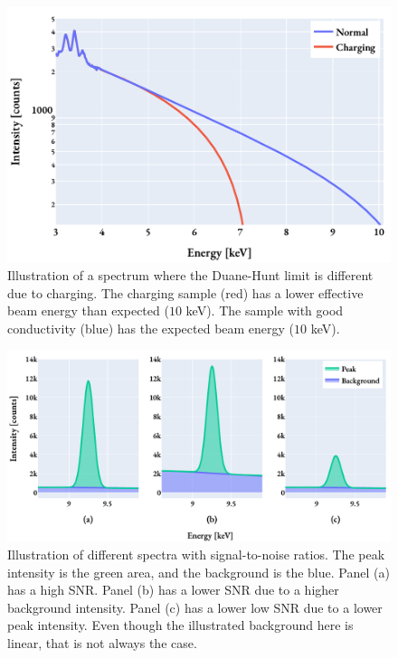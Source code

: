 
\begin{figure}[htp]
    \centering
    \includegraphics[width=0.6\linewidth]{figures/pp_duane-hunt.pdf}
    \caption{
        Illustration of a spectrum where the Duane-Hunt limit is different due to charging.
        The charging sample (red) has a lower effective beam energy than expected ($10$ keV).
        The sample with good conductivity (blue) has the expected beam energy ($10$ keV).
    }
    \label{fig:theory:eds_performance:overview:duanehunt}
\end{figure}


\begin{figure}[htp]
    \centering
    \includegraphics[width=0.8\linewidth]{figures/pp_fiori_snr.pdf}
    \caption{
        Illustration of different spectra with signal-to-noise ratios.
        The peak intensity is the green area, and the background is the blue.
        Panel (a) has a high SNR.
        Panel (b) has a lower SNR due to a higher background intensity.
        Panel (c) has a lower low SNR due to a lower peak intensity.
        Even though the illustrated background here is linear, that is not always the case.
    }
    \label{fig:theory:eds_performance:overview:fiori_snr}
\end{figure}


